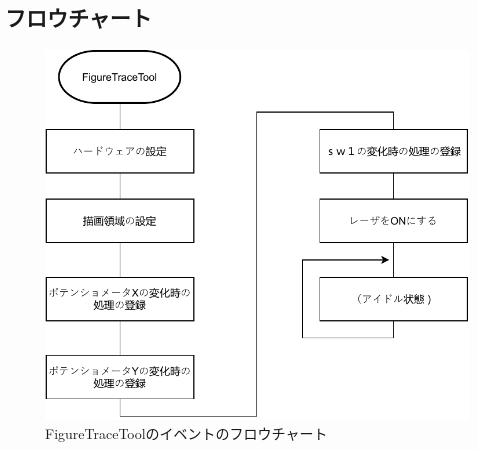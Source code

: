 \documentclass{jarticle}
\begin{document}
\subsection{フロウチャート}

\begin{figure}[H]
    \centering
    \includegraphics{kumikomiKadai8figureTraceTool.pdf}
    \caption{FigureTraceToolのイベントのフロウチャート}
    \label{fig:my_label}
\end{figure}
\end{document}

